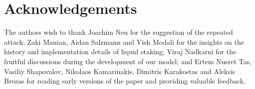 \section{Acknowledgements}

The authors wish to thank Joachim Neu for the suggestion of the repeated attack;
Zaki Manian, Aidan Salzmann and Vish Modali for the insights on the history and
implementation details of liquid staking;
Viraj Nadkarni for the fruitful discussions during the
development of our model; and Ertem Nusret Tas, Vasiliy Shapovalov,
Nikolaos Kamarinakis, Dimitris Karakostas and Aleksis Brezas for reading
early versions of the paper and providing valuable feedback.
